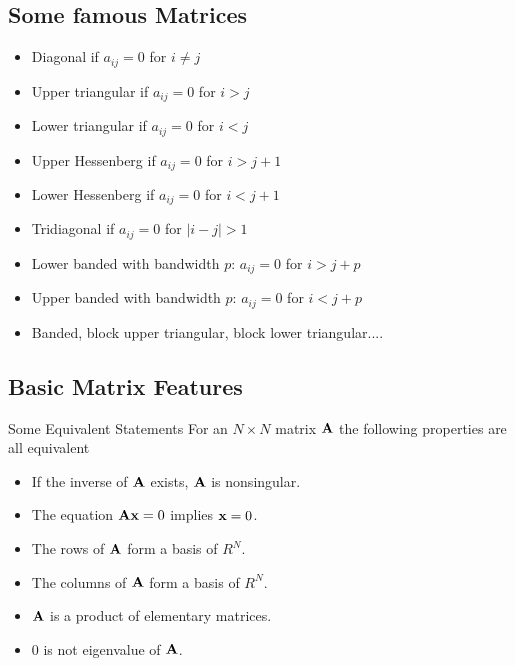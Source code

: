 \documentclass[%
twoside,                 %
final,                   %
10pt]{article}
\begin{document}
\subsection{Some famous Matrices}

\begin{itemize}
  \item Diagonal if $a_{ij}=0$ for $i\ne j$

  \item Upper triangular if $a_{ij}=0$ for $i > j$

  \item Lower triangular if $a_{ij}=0$ for $i < j$

  \item Upper Hessenberg if $a_{ij}=0$ for $i > j+1$

  \item Lower Hessenberg if $a_{ij}=0$ for $i < j+1$

  \item Tridiagonal if $a_{ij}=0$ for $|i -j| > 1$

  \item Lower banded with bandwidth $p$: $a_{ij}=0$ for $i > j+p$

  \item Upper banded with bandwidth $p$: $a_{ij}=0$ for $i < j+p$

  \item Banded, block upper triangular, block lower triangular....
\end{itemize}

\noindent
\subsection{Basic Matrix Features}

\begin{block}{Some Equivalent Statements }
For an $N\times N$ matrix  ${\bf A}$ the following properties are all equivalent

\begin{itemize}
  \item If the inverse of ${\bf A}$ exists, ${\bf A}$ is nonsingular.

  \item The equation ${\bf Ax}=0$ implies ${\bf x}=0$.

  \item The rows of ${\bf A}$ form a basis of $R^N$.

  \item The columns of ${\bf A}$ form a basis of $R^N$.

  \item ${\bf A}$ is a product of elementary matrices.

  \item $0$ is not eigenvalue of ${\bf A}$.
\end{itemize}

\noindent
\end{block}
\end{document}
